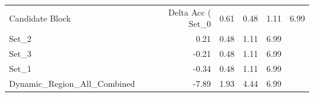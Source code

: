 \begin{tabular}{lrrrr}
\toprule
Candidate Block & Delta Acc (%
\midrule
Set_0 & 0.61 & 0.48 & 1.11 & 6.99 \\
Set_2 & 0.21 & 0.48 & 1.11 & 6.99 \\
Set_3 & -0.21 & 0.48 & 1.11 & 6.99 \\
Set_1 & -0.34 & 0.48 & 1.11 & 6.99 \\
Dynamic_Region_All_Combined & -7.89 & 1.93 & 4.44 & 6.99 \\
\bottomrule
\end{tabular}
